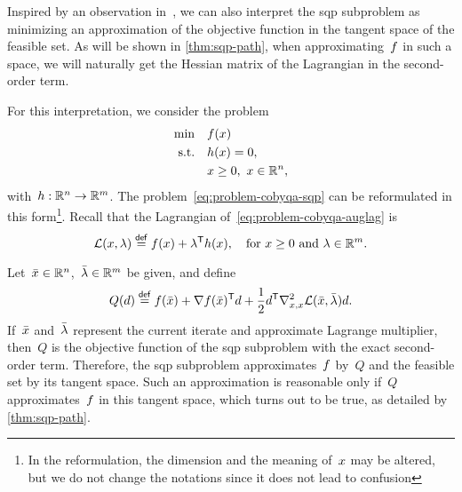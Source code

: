 Inspired by an observation in~\cite[\S~2]{Gill_Wong_2011}, we can also interpret the \gls{sqp} subproblem as minimizing an approximation of the objective function in the tangent space of the feasible set.
As will be shown in \cref{thm:sqp-path}, when approximating~$f$ in such a space, we will naturally get the Hessian matrix of the Lagrangian in the second-order term.

For this interpretation, we consider the problem
\begin{subequations}
    \label{eq:problem-cobyqa-auglag}
    \begin{align}
        \min        & \quad \obj(\iter)\\
        \text{s.t.} & \quad h(\iter) = 0,\\
                    & \quad \iter \ge 0, ~ \iter \in \R^n, \nonumber
    \end{align}
\end{subequations}
with~$h : \mathbb{R}^n \to \mathbb{R}^m$.
The problem~\cref{eq:problem-cobyqa-sqp} can be reformulated in this form\footnote{In the reformulation, the dimension and the meaning of~$\iter$ may be altered, but we do not change the notations since it does not lead to confusion}.
Recall that the Lagrangian of~\cref{eq:problem-cobyqa-auglag} is
\begin{equation*}
    \lag(\iter, \lm) \eqdef \obj(\iter) + \lm^{\T} h(\iter), \quad \text{for~$\iter \ge 0$ and~$\lm \in \R^m$.}
\end{equation*}

Let~$\bar{\iter} \in \R^n$,~$\bar{\lm} \in \R^m$ be given, and define
\begin{equation*}
    Q(\step) \eqdef \obj(\bar{\iter}) + \nabla \obj(\bar{\iter})^{\T} \step + \frac{1}{2} \step^{\T} \nabla_{x, x}^2 \lag(\bar{\iter}, \bar{\lm}) \step.
\end{equation*}
If~$\bar{\iter}$ and~$\bar{\lm}$ represent the current iterate and approximate Lagrange multiplier, then~$Q$ is the objective function of the \gls{sqp} subproblem with the exact second-order term.
Therefore, the \gls{sqp} subproblem approximates~$f$ by~$Q$ and the feasible set by its tangent space.
Such an approximation is reasonable only if~$Q$ approximates~$f$ in this tangent space, which turns out to be true, as detailed by \cref{thm:sqp-path}.

